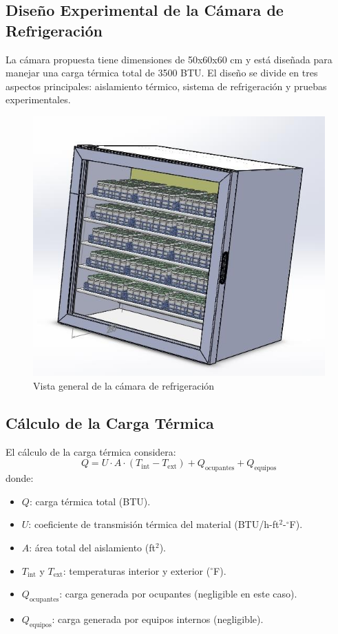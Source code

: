 \documentclass{article}
\begin{document}
\begin{multicols}{2}
	\section{Diseño Experimental de la Cámara de Refrigeración}
	La cámara propuesta tiene dimensiones de 50x60x60 cm y está diseñada para manejar una carga térmica total de 3500 BTU. El diseño se divide en tres aspectos principales: aislamiento térmico, sistema de refrigeración y pruebas experimentales.


	
	\begin{figure}[H]
		\centering
		\includegraphics[width=\linewidth]{figures/axo-parrilasycharolas}
		\caption{Vista general de la cámara de refrigeración}
		\label{fig:vista-camara}
	\end{figure}
	
	
	
	\subsection{Cálculo de la Carga Térmica}
	El cálculo de la carga térmica considera:
	\[
	Q = U \cdot A \cdot (T_{\text{int}} - T_{\text{ext}}) + Q_{\text{ocupantes}} + Q_{\text{equipos}} 
	\]
	donde:
	\begin{itemize}
		\item $Q$: carga térmica total (BTU).
		\item $U$: coeficiente de transmisión térmica del material (BTU/h-ft$^2$-$^\circ$F).
		\item $A$: área total del aislamiento (ft$^2$).
		\item $T_{\text{int}}$ y $T_{\text{ext}}$: temperaturas interior y exterior ($^\circ$F).
		\item $Q_{\text{ocupantes}}$: carga generada por ocupantes (negligible en este caso).
		\item $Q_{\text{equipos}}$: carga generada por equipos internos (negligible).
	\end{itemize}
	

\end{multicols}
\end{document}
